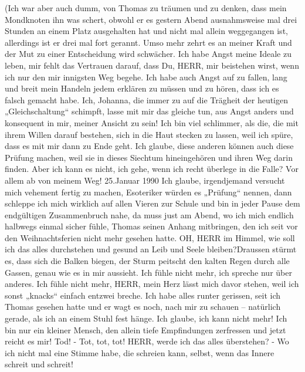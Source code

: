 (Ich war aber auch dumm, von Thomas zu träumen und zu denken, dass mein Mondknoten ihn was schert, obwohl er es gestern Abend ausnahmsweise mal drei Stunden an einem Platz ausgehalten hat und nicht mal allein weggegangen ist, allerdings ist er drei mal fort gerannt. 
Umso mehr zehrt es an meiner Kraft und der Mut zu einer Entscheidung wird schwächer. Ich habe Angst meine Ideale zu leben, mir fehlt das Vertrauen darauf, dass Du, HERR, mir beistehen wirst, wenn ich nur den mir innigsten Weg begehe.  Ich habe auch Angst auf zu fallen, lang und breit mein Handeln jedem erklären zu müssen und zu hören, dass ich es falsch gemacht habe.
Ich, Johanna, die immer zu auf die Trägheit der heutigen „Gleichschaltung“ schimpft, lasse mit mir das gleiche tun, aus Angst anders und konsequent in mir, meiner Ansicht zu sein!
Ich bin viel schlimmer, als die, die mit ihrem Willen darauf bestehen, sich in die Haut stecken zu lassen, weil ich spüre, dass es mit mir dann zu Ende geht. Ich glaube, diese anderen können auch diese Prüfung machen, weil sie in dieses Siechtum hineingehören und ihren Weg darin finden.
Aber ich kann es nicht, ich gehe, wenn ich recht überlege in die Falle?
Vor allem ab von meinem Weg!
25.Januar 1990
Ich glaube, irgendjemand versucht mich vehement fertig zu machen, Esoteriker würden es „Prüfung“ nennen, dann schleppe ich mich wirklich auf allen Vieren zur Schule und bin in jeder Pause dem endgültigen Zusammenbruch nahe, da muss just am Abend, wo ich mich endlich halbwegs einmal sicher fühle, Thomas seinen Anhang mitbringen, den ich seit vor den Weihnachtsferien nicht mehr gesehen hatte.
OH, HERR im Himmel, wie soll ich das alles durchstehen und gesund an Leib und Seele bleiben?Draussen stürmt es, dass sich die Balken biegen, der Sturm peitscht den kalten Regen durch alle Gassen, genau wie es in mir aussieht. Ich fühle nicht mehr, ich spreche nur über anderes.  Ich fühle nicht mehr, HERR, mein Herz lässt mich davor stehen, weil ich sonst „knacks“ einfach entzwei breche.
Ich habe alles runter gerissen, seit ich Thomas gesehen hatte und er wagt es noch, nach mir zu schauen – natürlich gerade, als ich an einem Stuhl fest hänge.
Ich glaube, ich kann nicht mehr!
Ich bin  nur ein kleiner Mensch, den allein tiefe Empfindungen zerfressen und jetzt reicht es mir!
Tod! - Tot, tot, tot!
HERR, werde ich das alles überstehen?
- Wo ich nicht mal eine Stimme habe, die schreien kann, selbst, wenn das Innere schreit und schreit!



